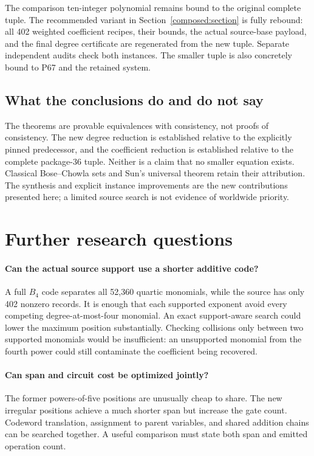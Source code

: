 \documentclass[11pt,a4paper]{article}
\theoremstyle{definition}
\begin{document}
The comparison ten-integer polynomial remains bound to the
original complete tuple. The recommended variant in
Section~\ref{composed:section} is fully rebound: all 402 weighted
coefficient recipes, their bounds, the actual source-base payload,
and the final degree certificate are regenerated from the new tuple.
Separate independent audits check both instances. The smaller tuple
is also concretely bound to P67 and the retained system.

\subsection{What the conclusions do and do not say}
The theorems are provable equivalences with consistency, not
proofs of consistency. The new degree reduction is established
relative to the explicitly pinned predecessor, and the
coefficient reduction is established relative to the complete
package-36 tuple. Neither is a claim that no smaller equation
exists. Classical Bose--Chowla sets and Sun's universal theorem
retain their attribution. The synthesis and explicit
instance improvements are the new contributions presented here;
a limited source search is not evidence of worldwide priority.

\section{Further research questions}
\label{sec:future}
\paragraph{Can the actual source support use a shorter additive code?}
A full $B_4$ code separates all 52,360 quartic monomials, while
the source has only 402 nonzero records. It is enough that each
supported exponent avoid every competing degree-at-most-four
monomial. An exact support-aware search could lower the maximum
position substantially. Checking collisions only between two
supported monomials would be insufficient: an unsupported
monomial from the fourth power could still contaminate the
coefficient being recovered.

\paragraph{Can span and circuit cost be optimized jointly?}
The former powers-of-five positions are unusually cheap to share.
The new irregular positions achieve a much shorter span but
increase the gate count. Codeword translation, assignment to
parent variables, and shared addition chains can be searched
together. A useful comparison must state both span and emitted
operation count.
\end{document}
